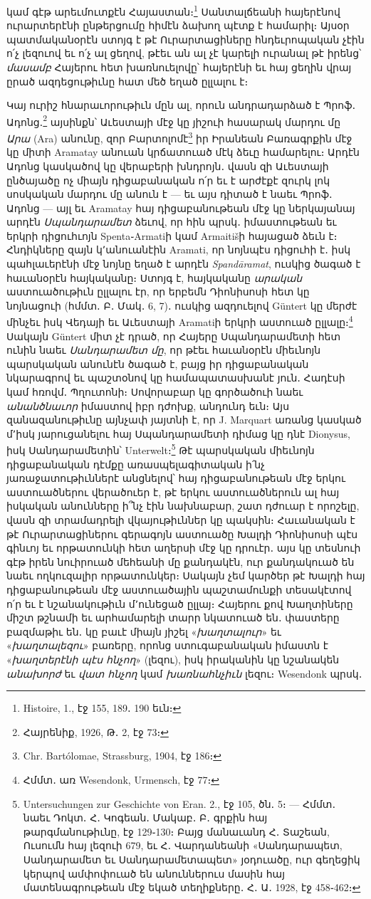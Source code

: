 \documentclass{article}
\begin{document}
{կամ գէթ արեւմուտքէն Հայաստան։\footnote{Histoire, 1., էջ 155, 189․ 190 եւն։} Սանտալճեանի հայերէնով ուրարտերէնի ընթերցումը հիմէն ձախող պէտք է համարիլ։ Այսօր պատմականօրէն ստոյգ է թէ Ուրարտացիները հնդեւրոպական չէին ո՛չ լեզուով եւ ո՛չ ալ ցեղով, թէեւ ան ալ չէ կարելի ուրանալ թէ իրենց՝ \emph{մասամբ} Հայերու հետ խառնուելովը՝ հայերէնի եւ հայ ցեղին վրայ ըրած ազդեցութիւնը հատ մեծ եղած ըլլալու է։

Կայ ուրիշ հնարաւորութիւն մըն ալ, որուն անդրադարձած է Պրոֆ․ Ադոնց․\footnote{Հայրենիք, 1926, Թ․ 2, էջ 73։} այսինքն՝ Աւեստայի մէջ կը յիշուի հասարակ մարդու մը \emph{Արա} (Ara) անունը, զոր Բարտոլոմէ\footnote{Chr. Bartólomae, Strassburg, 1904, էջ 186։} իր Իրանեան Բառագրքին մէջ կը միտի Aramatay անուան կրճատուած մէկ ձեւը համարելու։ Արդէն Ադոնց կասկածով կը վերաբերի խնդրոյն․ վասն զի Աւեստայի ընծայածը ոչ միայն դիցաբանական ո՛ր եւ է արժէքէ զուրկ լոկ սոսկական մարդու մը անուն է — եւ այս դիտած է նաեւ Պրոֆ․ Ադոնց — այլ եւ Aramatay հայ դիցաբանութեան մէջ կը ներկայանայ արդէն \emph{Սպանդարամետ} ձեւով, որ հին պրսկ․ իմաստութեան եւ երկրի դիցուհւոյն Spenta֊Armatiի կամ Armaitišի հայացած ձեւն է։ Հնդիկները զայն կ՚անուանէին Aramati, որ նոյնպէս դիցուհի է․ իսկ պահլաւերէնի մէջ նոյնը եղած է արդէն \emph{Spandāramat}, ուսկից ծագած է հաւանօրէն հայկականը։ Ստոյգ է, հայկականը \emph{արական} աստուածութիւն ըլլալու էր, որ երբեմն Դիոնիսոսի հետ կը նոյնացուի (հմմտ․ Բ․ Մակ․ 6, 7)․ ուսկից ազդուելով Güntert կը մերժէ մինչեւ իսկ Վեդայի եւ Աւեստայի Aramatiի երկրի աստուած ըլլալը։\footnote{Հմմտ․ առ Wesendonk, Urmensch, էջ 77։} Սակայն Güntert միտ չէ դրած, որ Հայերը Սպանդարամետի հետ ունին նաեւ \emph{Սանդարամետ մը}, որ թէեւ հաւանօրէն միեւնոյն պարսկական անունէն ծագած է, բայց իր դիցաբանական նկարագրով եւ պաշտօնով կը համապատասխանէ յուն․ Հադէսի կամ հռովմ․ Պղուտոնի։ Սովորաբար կը գործածուի նաեւ \emph{անանծնաւոր} իմաստով իբր դժոխք, անդունդ եւն։ Այս զանազանութիւնը այնչափ յայտնի է, որ J. Marquart առանց կասկած մ՚իսկ յարուցանելու հայ Սպանդարամետի դիմաց կը դնէ Dionysus, իսկ Սանդարամետին՝ Unterwelt։\footnote{Untersuchungen zur Geschichte von Eran. 2., էջ 105, ծն․ 5։ — Հմմտ․ նաեւ Դոկտ․ Հ․ Կոգեան․ Մակաբ․ Բ․ գրքին հայ թարգմանութիւնը, էջ 129֊130։ Բայց մանաւանդ Հ․ Տաշեան, Ուսումն հայ լեզուի 679, եւ Հ․ Վարդանեանի «Սանդարապետ, Սանդարամետ եւ Սանդարամետապետ» յօդուածը, ուր գեղեցիկ կերպով ամփոփուած են անուններուս մասին հայ մատենագրութեան մէջ եկած տեղիքները․ Հ․ Ա․ 1928, էջ 458֊462։} Թէ պարսկական միեւնոյն դիցաբանական դէմքը առասպելագիտական ի՛նչ յառաջատութիւններէ անցնելով՝ հայ դիցաբանութեան մէջ երկու աստուածներու վերածուեր է, թէ երկու աստուածներուն ալ հայ իսկական անունները ի՞նչ էին նախնաբար, շատ դժուար է որոշելը, վասն զի տրամադրելի վկայութիւններ կը պակսին։ Հաւանական է թէ Ուրարտացիներու գերագոյն աստուածը Խալդի Դիոնիսոսի պէս գինւոյ եւ որթատունկի հետ աղերսի մէջ կը դրուէր․ այս կը տեսնուի գէթ իրեն նուիրուած մեհեանի մը քանդակէն, ուր քանդակուած են նաեւ ողկուզալիր որթատունկեր։ Սակայն չեմ կարծեր թէ Խալդի հայ դիցաբանութեան մէջ աստուածային պաշտամունքի տեսակէտով ո՛ր եւ է նշանակութիւն մ՚ունեցած ըլլայ։ Հայերու քով Խաղտիները միշտ թշնամի եւ արհամարելի տարր նկատուած են․ փաստերը բազմաթիւ են․ կը բաւէ միայն յիշել «\emph{խաղտալուր}» եւ «\emph{խաղտալեզու}» բառերը, որոնց ստուգաբանական իմաստն է «\emph{խաղտերէնի պէս հնչող}» (լեզու), իսկ իրականին կը նշանակեն \emph{անախորժ} եւ \emph{վատ հնչող} կամ \emph{խառնահնչիւն} լեզու։ Wesendonk պրսկ․ }
\end{document}

